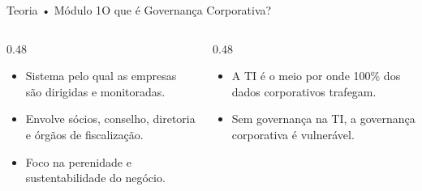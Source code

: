 \begin{senaiframe}{Teoria • Módulo 1}{O que é Governança Corporativa?}
  \begin{columns}[t]
    \begin{column}{0.48\textwidth}
      \begin{tcolorbox}[senaibluecard, title={Definição e Âmbito}]
        \begin{itemize}
          \item Sistema pelo qual as empresas são dirigidas e monitoradas.
          \item Envolve sócios, conselho, diretoria e órgãos de fiscalização.
          \item Foco na perenidade e sustentabilidade do negócio.
        \end{itemize}
      \end{tcolorbox}
    \end{column}
    \begin{column}{0.48\textwidth}
      \begin{tcolorbox}[senaicard, title={Conexão com a TI}]
        \begin{itemize}
          \item A TI é o meio por onde 100\% dos dados corporativos trafegam.
          \item Sem governança na TI, a governança corporativa é vulnerável.
        \end{itemize}
      \end{tcolorbox}
    \end{column}
  \end{columns}
\end{senaiframe}

